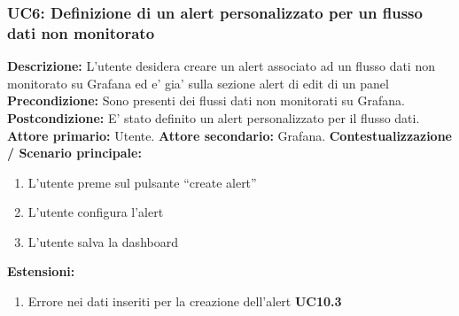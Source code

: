                 \subsubsection{UC6: Definizione di un alert personalizzato per un flusso dati non monitorato}
                    \textbf{Descrizione:} L’utente desidera creare un alert associato ad un flusso dati non monitorato su Grafana ed e’ gia’ sulla sezione alert di edit di un panel
                    \newline
                    \textbf{Precondizione:} Sono presenti dei flussi dati non monitorati su Grafana.
                    \newline
                    \textbf{Postcondizione:} E' stato definito un alert personalizzato per il flusso dati.
                    \newline
                    \textbf{Attore primario:} Utente.
                    \newline
                    \textbf{Attore secondario:} Grafana.
                    \newline
                    \textbf{Contestualizzazione / Scenario principale:} \begin{enumerate}
                            \item L’utente preme sul pulsante “create alert”
                            \item L’utente configura l’alert 
                            \item L’utente salva la dashboard
                        \end{enumerate}
                    
                    \textbf{Estensioni:} 
                    \begin{enumerate}
                            \item Errore nei dati inseriti per la creazione dell'alert \textbf{UC10.3}
                        \end{enumerate}
                
